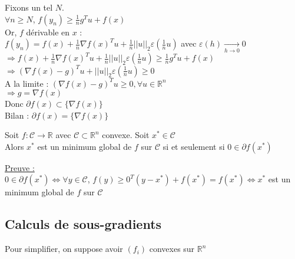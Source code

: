 \documentclass[12pt,a4paper]{article}
\newcommand{\propriete}[2]{%
    \begin{tcolorbox}[colback=white,colframe=green!25!white,title=\textbf{Propriété #1}, coltitle=black]
        #2
    \end{tcolorbox}
}
\begin{document}
\begin{enumerate}[label=\roman*)]
\begin{itemize}
        Fixons un tel $N$.\\
        $\forall n \geq N$, $f(y_n) \geq \frac{1}{n} g^T u + f(x)$\\

        Or, $f$ dérivable en $x$ :\\
        $f(y_n) = f(x) + \frac{1}{n} \nabla f(x)^T u + \frac{1}{n} ||u||_2 \varepsilon(\frac{1}{n}u)$ avec $\varepsilon(h) \xrightarrow[h \rightarrow 0]{} 0$\\
        $\Rightarrow f(x) + \frac{1}{n} \nabla f(x)^T u + \frac{1}{n} ||u||_2 \varepsilon(\frac{1}{n}u) \geq \frac{1}{n} g^T u + f(x)$\\
        $\Rightarrow (\nabla f(x) - g)^T u + ||u||_2 \varepsilon(\frac{1}{n}u) \geq 0$\\
        
        A la limite : $(\nabla f(x) - g)^T u \geq 0, \forall u \in \mathbb{R}^n$\\
        $\Rightarrow g = \nabla f(x)$\\

        Donc $\partial f(x) \subset \{\nabla f(x)\}$\\

        Bilan : $\partial f(x) = \{\nabla f(x)\}$\\
    \end{itemize}
\end{enumerate}


\propriete{}{
    Soit $f : \mathcal{C} \rightarrow \mathbb{R}$ avec $\mathcal{C} \subset \mathbb{R}^n$ convexe.
    Soit $x^* \in \mathcal{C}$\\
    Alors $x^*$ est un minimum global de $f$ sur $\mathcal{C}$ si et seulement si $0 \in \partial f(x^*)$
}

\noindent\underline{Preuve :}\\
$0 \in \partial f(x^*) \Leftrightarrow \forall y \in \mathcal{C}$, $f(y) \geq 0^T(y - x^*) + f(x^*) = f(x^*) \Leftrightarrow x^*$ est un minimum global de $f$ sur $\mathcal{C}$\\

\color{black}

\subsection{Calculs de sous-gradients}

Pour simplifier, on suppose avoir $(f_i)$ convexes sur $\mathbb{R}^n$\\
\end{document}
